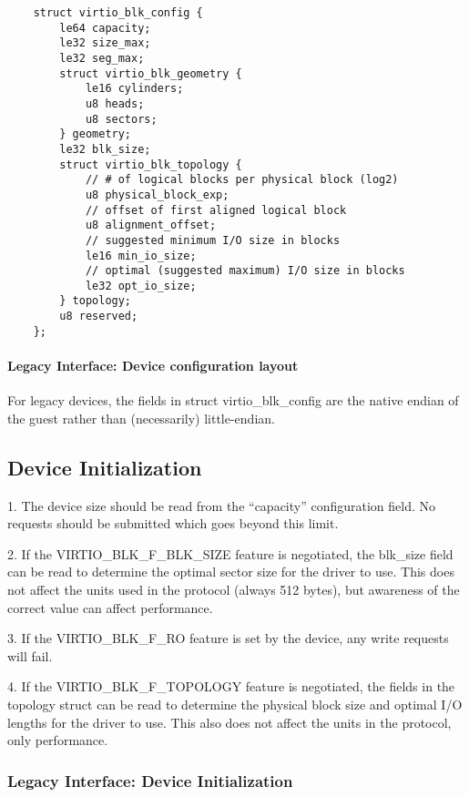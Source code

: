 \begin{lstlisting}
	struct virtio_blk_config {
		le64 capacity;
		le32 size_max;
		le32 seg_max;
		struct virtio_blk_geometry {
			le16 cylinders;
			u8 heads;
			u8 sectors;
		} geometry;
		le32 blk_size;
		struct virtio_blk_topology {
			// # of logical blocks per physical block (log2)
			u8 physical_block_exp;
			// offset of first aligned logical block
			u8 alignment_offset;
			// suggested minimum I/O size in blocks
			le16 min_io_size;
			// optimal (suggested maximum) I/O size in blocks
			le32 opt_io_size;
		} topology;
		u8 reserved;
	};
\end{lstlisting}


\paragraph{Legacy Interface: Device configuration layout}\label{sec:Device Types / Block Device / Feature bits / Device configuration layout / Legacy Interface: Device configuration layout}
For legacy devices, the fields in struct virtio_blk_config are the
native endian of the guest rather than (necessarily) little-endian.


\subsection{Device Initialization}\label{sec:Device Types / Block Device / Device Initialization}

1. The device size should be read from the “capacity”
  configuration field. No requests should be submitted which goes
  beyond this limit.

2. If the VIRTIO_BLK_F_BLK_SIZE feature is negotiated, the
  blk_size field can be read to determine the optimal sector size
  for the driver to use. This does not affect the units used in
  the protocol (always 512 bytes), but awareness of the correct
  value can affect performance.

3. If the VIRTIO_BLK_F_RO feature is set by the device, any write
  requests will fail.

4. If the VIRTIO_BLK_F_TOPOLOGY feature is negotiated, the fields in the
  topology struct can be read to determine the physical block size and optimal
  I/O lengths for the driver to use. This also does not affect the units
  in the protocol, only performance.

\subsubsection{Legacy Interface: Device Initialization}\label{sec:Device Types / Block Device / Device Initialization / Legacy Interface: Device Initialization}

